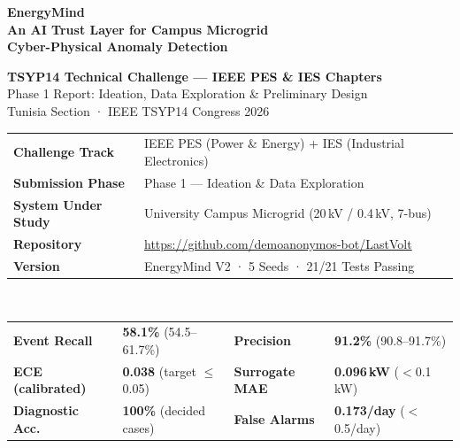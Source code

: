 \documentclass[12pt, a4paper]{article}
\begin{document}

\begin{titlepage}
\centering
\vspace*{2cm}

{\Huge\bfseries\color{AccentBlue} EnergyMind}\\[0.4cm]
{\Large\bfseries An AI Trust Layer for Campus Microgrid\\Cyber-Physical Anomaly Detection}\\[1.0cm]

\begin{tcolorbox}[colback=AccentBlue!8, colframe=AccentBlue!40, boxrule=0.8pt, arc=6pt,
  width=0.85\linewidth]
\centering
{\large\bfseries TSYP14 Technical Challenge — IEEE PES \& IES Chapters}\\[0.3cm]
{\normalsize Phase 1 Report: Ideation, Data Exploration \& Preliminary Design}\\[0.2cm]
{\small\color{TextDark!60} Tunisia Section · IEEE TSYP14 Congress 2026}
\end{tcolorbox}

\vspace{1.0cm}

\begin{tabularx}{0.95\linewidth}{p{4.2cm}X}
\toprule
\textbf{Challenge Track} & IEEE PES (Power \& Energy) + IES (Industrial Electronics)\\
\textbf{Submission Phase} & Phase 1 — Ideation \& Data Exploration\\
\textbf{System Under Study} & University Campus Microgrid (20\,kV / 0.4\,kV, 7-bus)\\
\textbf{Repository} & \url{https://github.com/demoanonymos-bot/LastVolt}\\
\textbf{Version} & EnergyMind V2 · 5 Seeds · 21/21 Tests Passing\\
\bottomrule
\end{tabularx}

\vspace{1.2cm}

\begin{tcolorbox}[resultbox, width=\linewidth]
\\[0.3cm]
\normalfont\small
\begin{tabularx}{0.95\linewidth}{p{3.0cm}X|p{3.2cm}X}
\toprule
\textbf{Event Recall} & \textbf{58.1\%} (54.5--61.7\%) & \textbf{Precision} & \textbf{91.2\%} (90.8--91.7\%)\\
\textbf{ECE (calibrated)} & \textbf{0.038} (target $\le$0.05) & \textbf{Surrogate MAE} & \textbf{0.096\,kW} ($<$0.1\,kW)\\
\textbf{Diagnostic Acc.} & \textbf{100\%} (decided cases) & \textbf{False Alarms} & \textbf{0.173/day} ($<$0.5/day)\\
\bottomrule
\end{tabularx}
\end{tcolorbox}


\end{titlepage}
\end{document}
